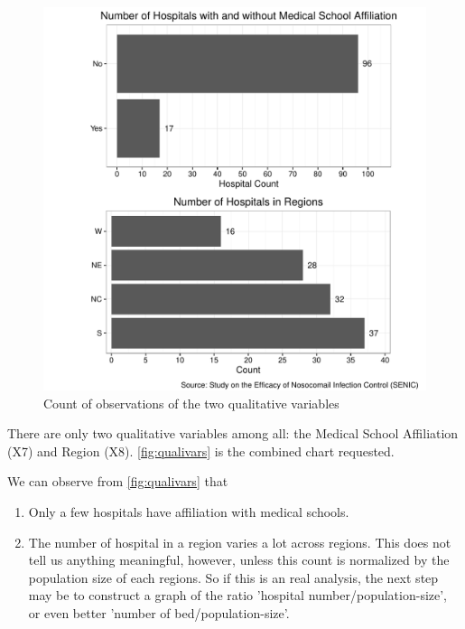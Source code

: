\documentclass[11pt]{article}
\begin{document}

\begin{figure}[H]
  \centering
  \includegraphics[scale=0.8]{qualitative_vars.pdf}
  \caption{Count of observations of the two
    qualitative variables}
  \label{fig:qualivars}
\end{figure}

There are only two qualitative variables among all: the Medical School
Affiliation (X7) and Region (X8). \autoref{fig:qualivars} is the combined
chart requested.

We can observe from \autoref{fig:qualivars} that
\begin{enumerate}
\item
  Only a few hospitals have affiliation with medical schools.
\item
  The number of hospital in a region varies a lot across regions. This
  does not tell us anything meaningful, however, unless this count is
  normalized by the population size of each regions. So if this is an
  real analysis, the next step may be to construct a graph of the ratio
  'hospital number/population-size', or even better
  'number of bed/population-size'.
\end{enumerate}
\end{document}
